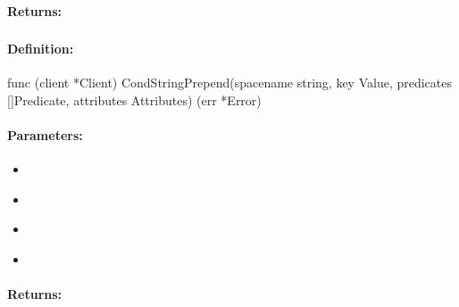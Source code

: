 \paragraph{Returns:}


\pagebreak
\subsubsection{}
\label{api:Go:CondStringPrepend}


\paragraph{Definition:}
\begin{gocode}
func (client *Client) CondStringPrepend(spacename string, key Value, predicates []Predicate, attributes Attributes) (err *Error)
\end{gocode}

\paragraph{Parameters:}
\begin{itemize}[noitemsep]
\item {}\\

\item {}\\

\item {}\\

\item {}\\

\end{itemize}

\paragraph{Returns:}


\pagebreak
\subsubsection{}
\label{api:Go:GroupStringPrepend}


